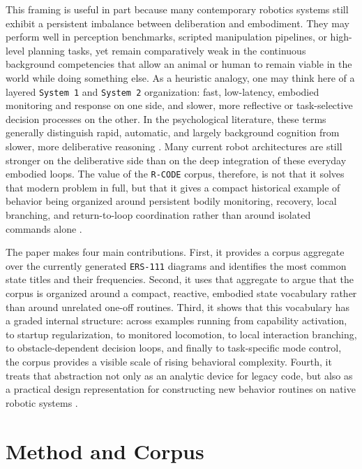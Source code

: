 \documentclass[11pt]{article}
\begin{document}
This framing is useful in part because many contemporary robotics
systems still exhibit a persistent imbalance between deliberation and
embodiment. They may perform well in perception benchmarks, scripted
manipulation pipelines, or high-level planning tasks, yet remain
comparatively weak in the continuous background competencies that allow
an animal or human to remain viable in the world while doing something
else. As a heuristic analogy, one may think here of a layered
\texttt{System 1} and \texttt{System 2} organization: fast,
low-latency, embodied monitoring and response on one side, and slower,
more reflective or task-selective decision processes on the other. In
the psychological literature, these terms generally distinguish rapid,
automatic, and largely background cognition from slower, more
deliberative reasoning \cite{kahneman2011thinking}. Many current robot architectures are still
stronger on the deliberative
side than on the deep integration of these everyday embodied loops.
The value of the \texttt{R-CODE} corpus, therefore, is not that it
solves that modern problem in full, but that it gives a compact
historical example of behavior being organized around persistent bodily
monitoring, recovery, local branching, and return-to-loop coordination
rather than around isolated commands alone \cite{kawaharazuka2024realworld,xu2024survey}.

The paper makes four main contributions. First, it provides a corpus
aggregate over the currently generated \texttt{ERS-111} diagrams and
identifies the most common state titles and their frequencies. Second,
it uses that aggregate to argue that the corpus is organized around a
compact, reactive, embodied state vocabulary rather than around
unrelated one-off routines. Third, it shows that this vocabulary has a
graded internal structure: across examples running from capability
activation, to startup regularization, to monitored locomotion, to
local interaction branching, to obstacle-dependent decision loops, and
finally to task-specific mode control, the corpus provides a visible
scale of rising behavioral complexity. Fourth, it treats that
abstraction not only
as an analytic device for legacy code, but also as a practical design
representation for constructing new behavior routines on native robotic
systems \cite{arkin1998behavior,brooks1991intelligence}.

\section*{Method and Corpus}
\end{document}
